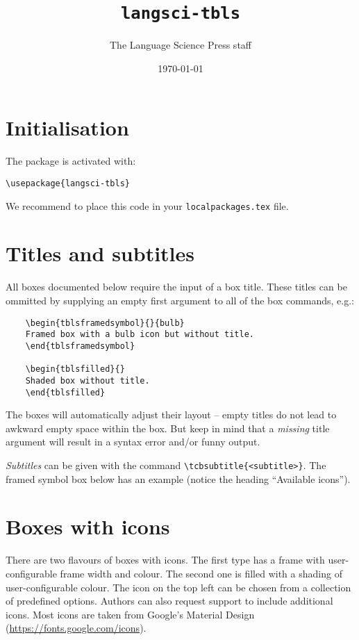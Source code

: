 \documentclass[output=paper]{langscibook}
\title{\texttt{langsci-tbls}}
\date{\today}
\author{The Language Science Press staff}
\begin{document}
\frontmatter
\maketitle
\section{Initialisation}
The package is activated with:
	
\begin{lstlisting}
\usepackage{langsci-tbls}
\end{lstlisting}

\noindent We recommend to place this code in your \texttt{localpackages.tex} file.

\section{Titles and subtitles}\enlargethispage{\baselineskip}

All boxes documented below require the input of a box title. These titles can be ommitted by supplying an empty first argument to all of the box commands, e.g.:

\begin{lstlisting}
	\begin{tblsframedsymbol}{}{bulb}
	Framed box with a bulb icon but without title.
	\end{tblsframedsymbol}
	
	\begin{tblsfilled}{}
	Shaded box without title.
	\end{tblsfilled}
\end{lstlisting}

The boxes will automatically adjust their layout -- empty titles do not lead to awkward empty space within the box. But keep in mind that a \emph{missing} title argument will result in a syntax error and/or funny output.

\emph{Subtitles} can be given with the command \texttt{\textbackslash tcbsubtitle\{<subtitle>\}}. The framed symbol box below has an example (notice the heading “Available icons”).

\section{Boxes with icons}

There are two flavours of boxes with icons. The first type has a frame with user-configurable frame width and colour. The second one is filled with a shading of user-configurable colour. The icon on the top left can be chosen from a collection of predefined options. Authors can also request \lsp{} support to include additional icons. Most icons are taken from Google's Material Design (\url{https://fonts.google.com/icons}).
\end{document}
